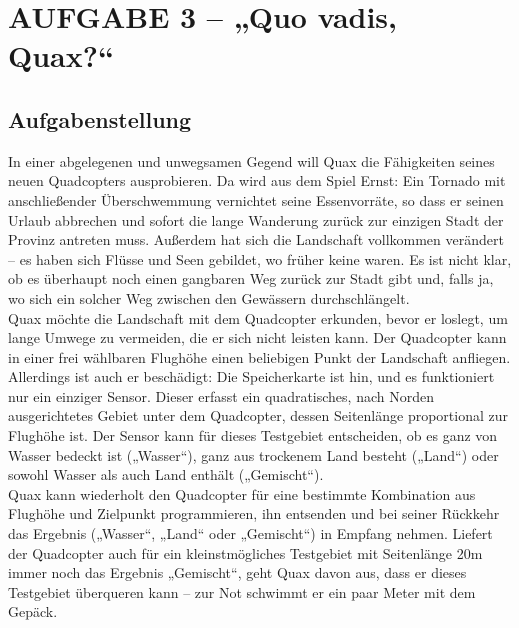 \documentclass[a4paper,12pt]{article}
\begin{document}

\newpage
\section{AUFGABE 3 – „Quo vadis, Quax?“}



\subsection{Aufgabenstellung}
In einer abgelegenen und unwegsamen Gegend will Quax die Fähigkeiten seines neuen Quadcopters
ausprobieren. Da wird aus dem Spiel Ernst: Ein Tornado mit anschließender Überschwemmung
vernichtet seine Essenvorräte, so dass er seinen Urlaub abbrechen und sofort die
lange Wanderung zurück zur einzigen Stadt der Provinz antreten muss. Außerdem hat sich die
Landschaft vollkommen verändert – es haben sich Flüsse und Seen gebildet, wo früher keine
waren. Es ist nicht klar, ob es überhaupt noch einen gangbaren Weg zurück zur Stadt gibt und,
falls ja, wo sich ein solcher Weg zwischen den Gewässern durchschlängelt.
\\[0.4cm]
Quax möchte die Landschaft mit dem Quadcopter erkunden, bevor er loslegt, um lange Umwege
zu vermeiden, die er sich nicht leisten kann. Der Quadcopter kann in einer frei wählbaren
Flughöhe einen beliebigen Punkt der Landschaft anfliegen. Allerdings ist auch er beschädigt:
Die Speicherkarte ist hin, und es funktioniert nur ein einziger Sensor. Dieser erfasst ein quadratisches,
nach Norden ausgerichtetes Gebiet unter dem Quadcopter, dessen Seitenlänge proportional
zur Flughöhe ist. Der Sensor kann für dieses Testgebiet entscheiden, ob es ganz von
Wasser bedeckt ist („Wasser“), ganz aus trockenem Land besteht („Land“) oder sowohl Wasser
als auch Land enthält („Gemischt“).
\\[0.4cm]
Quax kann wiederholt den Quadcopter für eine bestimmte Kombination aus Flughöhe und Zielpunkt
programmieren, ihn entsenden und bei seiner Rückkehr das Ergebnis („Wasser“, „Land“
oder „Gemischt“) in Empfang nehmen. Liefert der Quadcopter auch für ein kleinstmögliches
Testgebiet mit Seitenlänge 20m immer noch das Ergebnis „Gemischt“, geht Quax davon aus,
dass er dieses Testgebiet überqueren kann – zur Not schwimmt er ein paar Meter mit dem Gepäck.
\end{document}
